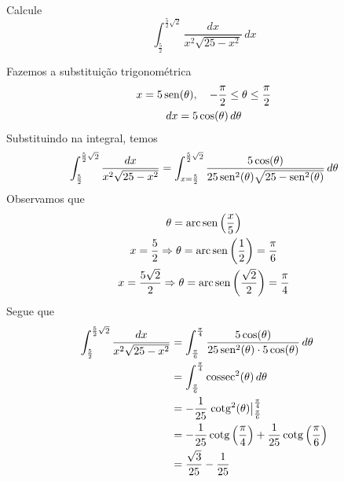 \begin{exeresol}
  Calcule
  \begin{equation}
    \int_{\frac{5}{2}}^{\frac{5}{2}\sqrt{2}}\frac{dx}{x^2\sqrt{25-x^2}}\,dx
  \end{equation}
\end{exeresol}
\begin{resol}
  Fazemos a substituição trigonométrica
  \begin{gather}
    x = 5\operatorname{sen}(\theta),\quad -\frac{\pi}{2}\leq\theta\leq\frac{\pi}{2}\\
    dx = 5\cos(\theta)\,d\theta
  \end{gather}
  Substituindo na integral, temos
  \begin{equation}
    \int_{\frac{5}{2}}^{\frac{5}{2}\sqrt{2}}\frac{dx}{x^2\sqrt{25-x^2}} = \int_{x=\frac{5}{2}}^{\frac{5}{2}\sqrt{2}}\frac{5\cos(\theta)}{25\operatorname{sen}^2(\theta)\sqrt{25-\operatorname{sen}^2(\theta)}}\,d\theta
  \end{equation}
  Observamos que
  \begin{gather}
    \theta = \operatorname{arc}\operatorname{sen}\left(\frac{x}{5}\right)\\
    x = \frac{5}{2} \Rightarrow \theta = \operatorname{arc}\operatorname{sen}\left(\frac{1}{2}\right) = \frac{\pi}{6}\\
    x = \frac{5\sqrt{2}}{2} \Rightarrow \theta = \operatorname{arc}\operatorname{sen}\left(\frac{\sqrt{2}}{2}\right) = \frac{\pi}{4}
  \end{gather}
  Segue que
  \begin{align}
    \int_{\frac{5}{2}}^{\frac{5}{2}\sqrt{2}}\frac{dx}{x^2\sqrt{25-x^2}} &= \int_{\frac{\pi}{6}}^{\frac{\pi}{4}}\frac{5\cos(\theta)}{25\operatorname{sen}^2(\theta)\cdot 5\cos(\theta)}\,d\theta\\
                                                                        &= \int_{\frac{\pi}{6}}^{\frac{\pi}{4}}\operatorname{cossec}^2(\theta)\,d\theta\\
                                                                        &= -\frac{1}{25}\left.\operatorname{cotg}^2(\theta)\right|_{\frac{\pi}{6}}^{\frac{\pi}{4}}\\
                                                                        &= -\frac{1}{25}\operatorname{cotg}\left(\frac{\pi}{4}\right) + \frac{1}{25}\operatorname{cotg}\left(\frac{\pi}{6}\right)\\
                                                                        &= \frac{\sqrt{3}}{25} - \frac{1}{25}
  \end{align}  
\end{resol}

